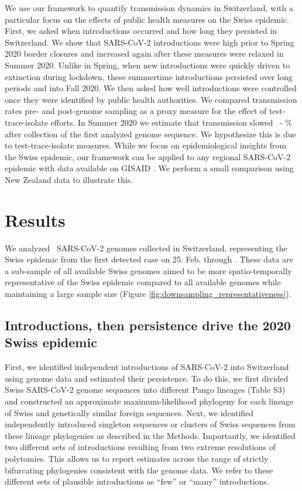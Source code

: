 \documentclass[9pt,twoside,lineno]{pnas-new} %
\begin{document}
We use our framework to quantify transmission dynamics in Switzerland, with a particular focus on the effects of public health measures on the Swiss epidemic. First, we asked when introductions occurred and how long they persisted in Switzerland. We show that SARS-CoV-2 introductions were high prior to Spring 2020 border closures and increased again after these measures were relaxed in Summer 2020. Unlike in Spring, when new introductions were quickly driven to extinction during lockdown, these summertime introductions persisted over long periods and into Fall 2020. We then asked how well introductions were controlled once they were identified by public health authorities. We compared transmission rates pre- and post-genome sampling as a proxy measure for the effect of test-trace-isolate efforts. In Summer 2020 we estimate that transmission slowed \summermaxdampingpercentmedianCHEnosampUB\ - \summermindampingpercentmedianCHEnosampUB\% after collection of the first analyzed genome sequence. We hypothesize this is due to test-trace-isolate measures. While we focus on epidemiological insights from the Swiss epidemic, our framework can be applied to any regional SARS-CoV-2 epidemic with data available on GISAID \cite{GISAID}. We perform a small comparison using New Zealand data to illustrate this. 

\section{Results}
We analyzed \nfocalsamples\ SARS-CoV-2 genomes collected in Switzerland, representing the Swiss epidemic from the first detected case on 25. Feb. through \maxdate. These data are a sub-sample of all available Swiss genomes aimed to be more spatio-temporally representative of the Swiss epidemic compared to all available genomes while maintaining a large sample size (Figure  \ref{fig:downsampling_representativeness}). 

\subsection{Introductions, then persistence drive the 2020 Swiss epidemic}

First, we identified independent introductions of SARS-CoV-2 into Switzerland using genome data and estimated their persistence. To do this, we first divided Swiss SARS-CoV-2 genome sequences into different Pango lineages (Table S3) and constructed an approximate maximum-likelihood phylogeny for each lineage of Swiss and genetically similar foreign sequences. Next, we identified independently introduced singleton sequences or clusters of Swiss sequences from these lineage phylogenies as described in the Methods. Importantly, we identified two different sets of introductions resulting from two extreme resolutions of polytomies. This allows us to report estimates across the range of strictly bifurcating phylogenies consistent with the genome data. We refer to these different sets of plausible introductions as ``few'' or ``many'' introductions.
\end{document}
